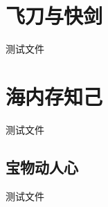 \documentclass[12pt]{scrbook}
\begin{document}
\begin{CJK}{UTF8}{song}
\tableofcontents
       \chapter{飞刀与快剑}
       测试文件
       \chapter{海内存知己}
       测试文件
              \section {宝物动人心}
              测试文件
\newpage %
\end{CJK}
\end{document}
